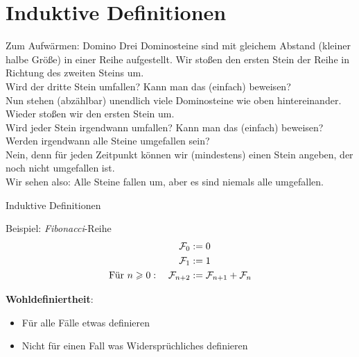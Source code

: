 

\section{Induktive Definitionen}

\begin{frame}{Zum Aufwärmen: Domino}
	Drei Dominosteine sind mit gleichem Abstand (kleiner halbe Größe) in einer Reihe aufgestellt. Wir stoßen den ersten Stein der Reihe in Richtung des zweiten Steins um. \\
	Wird der dritte Stein umfallen? Kann man das (einfach) beweisen? \\[1em]
	\pause
	Nun stehen (abzählbar) unendlich viele Dominosteine wie oben hintereinander. Wieder stoßen wir den ersten Stein um. \\
	Wird jeder Stein irgendwann umfallen? Kann man das (einfach) beweisen? \\[1em]
	\pause
	Werden irgendwann alle Steine umgefallen sein? \\
	\pause Nein, denn für jeden Zeitpunkt können wir (mindestens) einen Stein angeben, der noch nicht umgefallen ist.\\
	Wir sehen also: Alle Steine fallen um, aber es sind niemals alle umgefallen.
\end{frame}

\newcommand{\Fib}{\mathcal{F}\hspace{-1pt}}

\begin{frame}{Induktive Definitionen}
	\begin{exampleblock}{Beispiel: \emph{Fibonacci}-Reihe}
		\begin{align*}
		\Fib_0 &:= 0 \\
		\Fib_1 &:= 1 \\
		\text{Für } n \geq 0: \quad \Fib_{n+2} &:= \Fib_{n+1} + \Fib_n 		
		\end{align*}
		\pause
		\vspace{-\baselineskip}
		
		\pause
		\textbf{Wohldefiniertheit}: 
		\begin{itemize}
			\item Für alle Fälle etwas definieren 
			\item Nicht für einen Fall was Widersprüchliches definieren
		\end{itemize}
		
	\end{exampleblock}
	
\end{frame}

